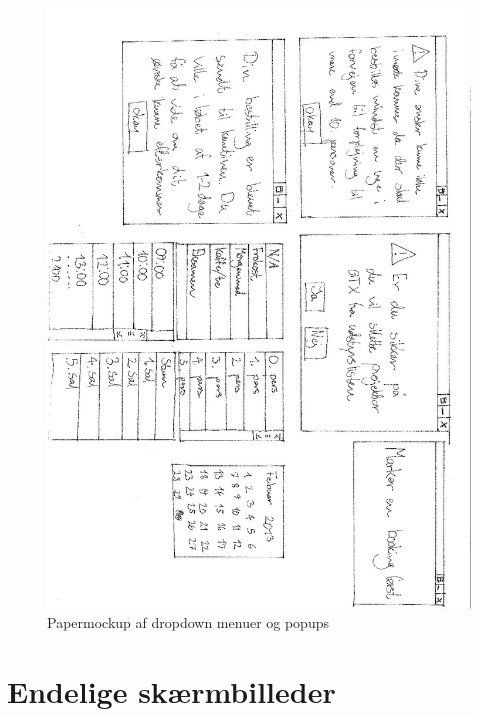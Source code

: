 \begin{figure}[h!]
  \centering
    \includegraphics[width=\textwidth]{Appendix/GUI-Prototype/PaperMockup/PopUpDropDowns_002}
  \caption{Papermockup  af dropdown menuer og popups}
\label{App_GUI_paper_PopUpDropDowns}
\end{figure}

\clearpage
\section{Endelige skærmbilleder}
\label{App_GUI_final}

